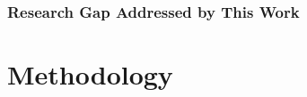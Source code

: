 \documentclass[12pt, a4paper]{article}
\begin{document}

\subsubsection{Research Gap Addressed by This Work}


\section{Methodology}









\end{document}
